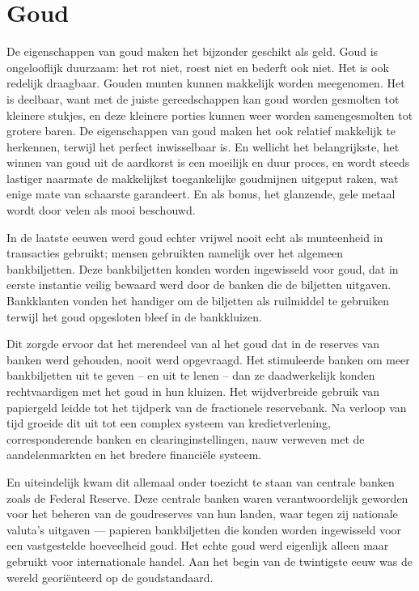 \documentclass[
  a5paper,
  smalldemyvopaper,11pt,twoside,onecolumn,openright,extrafontsizes]{memoir}
\begin{document}
\section{Goud}\label{goud}

De eigenschappen van goud maken het bijzonder geschikt als geld. Goud is
ongelooflijk duurzaam: het rot niet, roest niet en bederft ook niet. Het
is ook redelijk draagbaar. Gouden munten kunnen makkelijk worden
meegenomen. Het is deelbaar, want met de juiste gereedschappen kan goud
worden gesmolten tot kleinere stukjes, en deze kleinere porties kunnen
weer worden samengesmolten tot grotere baren. De eigenschappen van goud
maken het ook relatief makkelijk te herkennen, terwijl het perfect
inwisselbaar is. En wellicht het belangrijkste, het winnen van goud uit
de aardkorst is een moeilijk en duur proces, en wordt steeds lastiger
naarmate de makkelijkst toegankelijke goudmijnen uitgeput raken, wat
enige mate van schaarste garandeert. En als bonus, het glanzende, gele
metaal wordt door velen als mooi beschouwd.

In de laatste eeuwen werd goud echter vrijwel nooit echt als munteenheid
in transacties gebruikt; mensen gebruikten namelijk over het algemeen
bankbiljetten. Deze bankbiljetten konden worden ingewisseld voor goud,
dat in eerste instantie veilig bewaard werd door de banken die de
biljetten uitgaven. Bankklanten vonden het handiger om de biljetten als
ruilmiddel te gebruiken terwijl het goud opgesloten bleef in de
bankkluizen.

Dit zorgde ervoor dat het merendeel van al het goud dat in de reserves
van banken werd gehouden, nooit werd opgevraagd. Het stimuleerde banken
om meer bankbiljetten uit te geven -- en uit te lenen -- dan ze
daadwerkelijk konden rechtvaardigen met het goud in hun kluizen. Het
wijdverbreide gebruik van papiergeld leidde tot het tijdperk van de
fractionele reservebank. Na verloop van tijd groeide dit uit tot een
complex systeem van kredietverlening, corresponderende banken en
clearinginstellingen, nauw verweven met de aandelenmarkten en het
bredere financiële systeem.

En uiteindelijk kwam dit allemaal onder toezicht te staan van centrale
banken zoals de Federal Reserve. Deze centrale banken waren
verantwoordelijk geworden voor het beheren van de goudreserves van hun
landen, waar tegen zij nationale valuta's uitgaven --- papieren
bankbiljetten die konden worden ingewisseld voor een vastgestelde
hoeveelheid goud. Het echte goud werd eigenlijk alleen maar gebruikt
voor internationale handel. Aan het begin van de twintigste eeuw was de
wereld georiënteerd op de goudstandaard.
\end{document}
